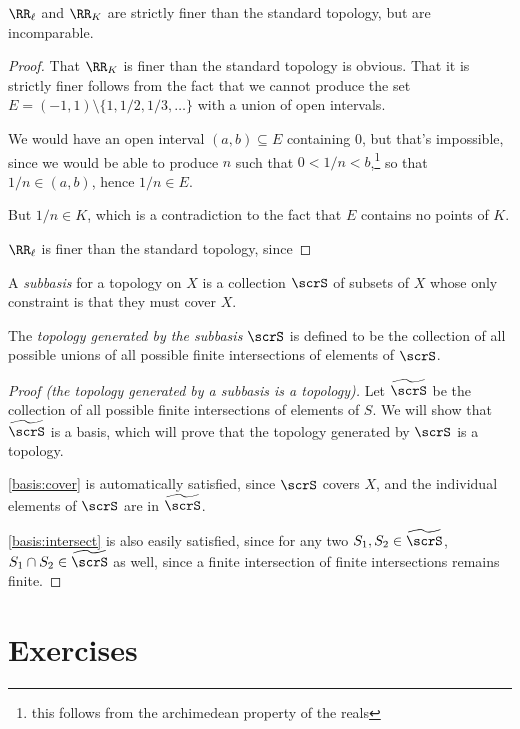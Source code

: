 \documentclass{article}
\begin{document}
\begin{lemma}
    $\RR_\ell$ and $\RR_K$ are strictly finer than the standard topology, but are incomparable.
\end{lemma}

\begin{proof}
    That $\RR_K$ is finer than the standard topology is obvious.
    That it is strictly finer follows from the fact that we cannot produce the set $E = (-1,1) \setminus \{1, 1/2, 1/3, \ldots\}$ with a union of open intervals.

    We would have an open interval $(a,b) \subseteq E$ containing $0$, but that's impossible, since we would be able to produce $n$ such that $0 < 1/n < b$,\footnote{this follows from the archimedean property of the reals} so that $1/n \in (a,b)$, hence $1/n \in E$.

    But $1/n \in K$, which is a contradiction to the fact that $E$ contains no points of $K$.

    $\RR_\ell$ is finer than the standard topology, since
\end{proof}

\begin{definition}
    A \textit{subbasis} for a topology on $X$ is a collection $\scrS$ of subsets of $X$ whose only constraint is that they must cover $X$.

    The \textit{topology generated by the subbasis} $\scrS$ is defined to be the collection of all possible unions of all possible finite intersections of elements of $\scrS$.
\end{definition}

\begin{proof}[Proof (the topology generated by a subbasis is a topology)]
    Let $\widetilde{\scrS}$ be the collection of all possible finite intersections of elements of $S$.
    We will show that $\widetilde{\scrS}$ is a basis, which will prove that the topology generated by $\scrS$ is a topology.

    \ref{basis:cover} is automatically satisfied, since $\scrS$ covers $X$, and the individual elements of $\scrS$ are in $\widetilde{\scrS}$.

    \ref{basis:intersect} is also easily satisfied, since for any two $S_1, S_2 \in \widetilde{\scrS}$, $S_1 \cap S_2 \in \widetilde{\scrS}$ as well, since a finite intersection of finite intersections remains finite.
\end{proof}

\section*{Exercises}
\end{document}
